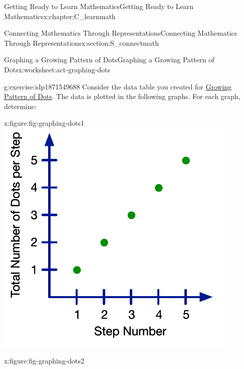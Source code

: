 \documentclass[oneside,10pt,]{book}
\numberwithin{equation}{chapter}
\begin{document}
\begin{chapterptx}{Getting Ready to Learn Mathematics}{}{Getting Ready to Learn Mathematics}{}{}{x:chapter:C_learnmath}
\begin{sectionptx}{Connecting Mathematics Through Representations}{}{Connecting Mathematics Through Representations}{}{}{x:section:S_connectmath}
\begin{worksheet-subsection}{Graphing a Growing Pattern of Dots}{}{Graphing a Growing Pattern of Dots}{}{}{x:worksheet:act-graphing-dots}
\begin{divisionexercise}{1}{}{}{g:exercise:idp1871549688}
Consider the data table you created for \hyperref[x:worksheet:act-growing-dots]{Growing Pattern of Dots}. The data is plotted in the following graphs. For each graph, determine: \begin{sidebyside}{4}{0}{0}{0}%
\begin{sbspanel}{0.25}%
\begin{figureptx}{}{x:figure:fig-graphing-dots1}{}%
\includegraphics[width=\linewidth]{external/graphing-dots1.pdf}
\tcblower
\end{figureptx}%
\end{sbspanel}%
\begin{sbspanel}{0.25}%
\begin{figureptx}{}{x:figure:fig-graphing-dots2}{}%

\end{figureptx}
\end{sbspanel}
\end{sidebyside}
\end{divisionexercise}
\end{worksheet-subsection}
\end{sectionptx}
\end{chapterptx}
\end{document}
